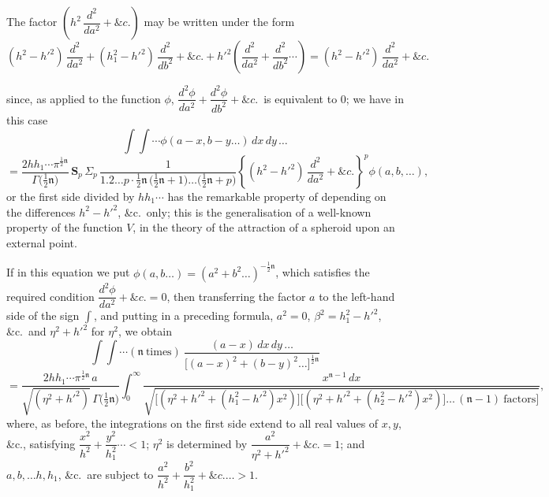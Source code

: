\documentclass[11pt]{article}
\begin{document}
The factor $\left(h^{2}\,\dfrac{d^{2}}{da^{2}} + \&c.\right)$ may be written under the form
\[
(h^{2} - h'^{2})\,\frac{d^{2}}{da^{2}} + (h_{1}^{2} - h'^{2})\,\frac{d^{2}}{db^{2}} + \&c. + h'^{2}\left(\frac{d^{2}}{da^{2}} + \frac{d^{2}}{db^{2}}\cdots\right) = (h^{2} - h'^{2})\,\frac{d^{2}}{da^{2}} + \&c.
\]

\clearpage

since, as applied to the function $\phi$, $\dfrac{d^{2}\phi}{da^{2}} + \dfrac{d^{2}\phi}{db^{2}} + \&c.$\ is equivalent to $0$; we have in this case
\[
\int\!\!\int \cdots \phi(a - x, b - y \ldots)\,dx\,dy\,\ldots
\]
\[
= \frac{2hh_{1}\cdots\pi^{\frac{1}{2}\mathfrak{n}}}{\Gamma\bigl(\tfrac{1}{2}\mathfrak{n}\bigr)}\,\boldsymbol{S}_{p}\,\Sigma_{p}\,\frac{1}{1.2\ldots p\cdot\tfrac{1}{2}\mathfrak{n}\,\bigl(\tfrac{1}{2}\mathfrak{n} + 1\bigr)\ldots\bigl(\tfrac{1}{2}\mathfrak{n} + p\bigr)}\left\{(h^{2} - h'^{2})\,\frac{d^{2}}{da^{2}} + \&c.\right\}^{p}\phi(a, b, \ldots),
\]
or the first side divided by $hh_{1}\cdots$ has the remarkable property of depending on the differences $h^{2} - h'^{2}$, \&c.\ only; this is the generalisation of a well-known property of the function $V$, in the theory of the attraction of a spheroid upon an external point.

If in this equation we put $\phi(a, b \ldots) = (a^{2} + b^{2}\ldots)^{-\frac{1}{2}\mathfrak{n}}$, which satisfies the required condition $\dfrac{d^{2}\phi}{da^{2}} + \&c. = 0$, then transferring the factor $a$ to the left-hand side of the sign $\int$, and putting in a preceding formula, $a^{2} = 0$, $\beta^{2} = h_{1}^{2} - h'^{2}$, \&c.\ and $\eta^{2} + h'^{2}$ for $\eta^{2}$, we obtain
\[
\int\!\!\int \cdots (\mathfrak{n}\ \text{times})\ \frac{(a - x)\,dx\,dy\,\ldots}{\bigl[(a - x)^{2} + (b - y)^{2} \ldots\bigr]^{\frac{1}{2}\mathfrak{n}}}
\]
\[
= \frac{2hh_{1}\cdots\pi^{\frac{1}{2}\mathfrak{n}}\,a}{\sqrt{(\eta^{2} + h'^{2})}\,\Gamma\bigl(\tfrac{1}{2}\mathfrak{n}\bigr)}\int_{0}^{\infty}\frac{x^{\mathfrak{n} - 1}\,dx}{\sqrt{\bigl[(\eta^{2} + h'^{2} + (h_{1}^{2} - h'^{2})x^{2})\bigr]\bigl[(\eta^{2} + h'^{2} + (h_{2}^{2} - h'^{2})x^{2})\bigr]\ldots\,(\mathfrak{n} - 1)\ \text{factors}\bigr]}},
\]
where, as before, the integrations on the first side extend to all real values of $x, y$, \&c., satisfying $\dfrac{x^{2}}{h^{2}} + \dfrac{y^{2}}{h_{1}^{2}}\cdots < 1$; $\eta^{2}$ is determined by $\dfrac{a^{2}}{\eta^{2} + h'^{2}} + \&c. = 1$; and $a, b, \ldots h, h_{1}$, \&c.\ are subject to $\dfrac{a^{2}}{h^{2}} + \dfrac{b^{2}}{h_{1}^{2}} + \&c.\ldots > 1$.
\end{document}
